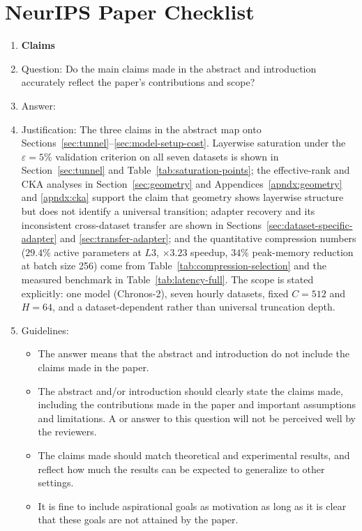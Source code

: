 \section*{NeurIPS Paper Checklist}

\begin{enumerate}

\item {\bf Claims}
    \item[] Question: Do the main claims made in the abstract and introduction accurately reflect the paper's contributions and scope?
    \item[] Answer: \answerYes{}
    \item[] Justification: The three claims in the abstract map onto Sections~\ref{sec:tunnel}--\ref{sec:model-setup-cost}. Layerwise saturation under the \(\varepsilon=5\%\) validation criterion on all seven datasets is shown in Section~\ref{sec:tunnel} and Table~\ref{tab:saturation-points}; the effective-rank and CKA analyses in Section~\ref{sec:geometry} and Appendices~\ref{apndx:geometry} and \ref{apndx:cka} support the claim that geometry shows layerwise structure but does not identify a universal transition; adapter recovery and its inconsistent cross-dataset transfer are shown in Sections~\ref{sec:dataset-specific-adapter} and \ref{sec:transfer-adapter}; and the quantitative compression numbers (\(29.4\%\) active parameters at \(L3\), \(\times 3.23\) speedup, \(34\%\) peak-memory reduction at batch size 256) come from Table~\ref{tab:compression-selection} and the measured benchmark in Table~\ref{tab:latency-full}. The scope is stated explicitly: one model (Chronos-2), seven hourly datasets, fixed \(C=512\) and \(H=64\), and a dataset-dependent rather than universal truncation depth.
    \item[] Guidelines:
    \begin{itemize}
        \item The answer \answerNA{} means that the abstract and introduction do not include the claims made in the paper.
        \item The abstract and/or introduction should clearly state the claims made, including the contributions made in the paper and important assumptions and limitations. A \answerNo{} or \answerNA{} answer to this question will not be perceived well by the reviewers. 
        \item The claims made should match theoretical and experimental results, and reflect how much the results can be expected to generalize to other settings. 
        \item It is fine to include aspirational goals as motivation as long as it is clear that these goals are not attained by the paper. 
    \end{itemize}


\end{enumerate}
